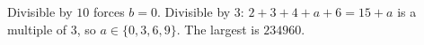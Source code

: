 Divisible by $10$ forces $b=0$. Divisible by $3$: $2+3+4+a+6=15+a$ is a multiple of $3$, so $a\in\{0,3,6,9\}$. The largest is $\boxed{234960}$.
